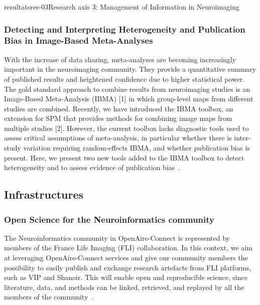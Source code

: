 \documentclass{ra2018}
\begin{document}
\begin{module}{resultats}{res-03}{Research axis 3: Management of Information in Neuroimaging}
\subsubsection{Detecting and Interpreting Heterogeneity and Publication Bias in Image-Based Meta-Analyses}
\begin{participants}
\end{participants}
With the increase of data sharing, meta-analyses are becoming increasingly important in the neuroimaging community. They provide a quantitative summary of published results and heightened confidence due to higher statistical power. The gold standard approach to combine results from neuroimaging studies is an Image-Based Meta-Analysis (IBMA) [1] in which group-level maps from different studies are combined. Recently, we have introduced the IBMA toolbox, an extension for SPM that provides methods for combining image maps from multiple studies [2]. However, the current toolbox lacks diagnostic tools used to assess critical assumptions of meta-analysis, in particular whether there is inter-study variation requiring random-effects IBMA, and whether publication bias is present. Here, we present two new tools added to the IBMA toolbox to detect heterogeneity and to assess evidence of publication bias~\cite{maullinsapey:inserm-01933023}.

\subsection{Infrastructures}
\subsubsection{Open Science for the Neuroinformatics community}
\begin{participants}
\end{participants}
The Neuroinformatics community in OpenAire-Connect is represented by members of the France Life Imaging (FLI) collaboration. In this context, we aim at leveraging OpenAire-Connect services and give our community members the possibility to easily publish and exchange research artefacts from FLI platforms, such as VIP and Shanoir. This will enable open and reproducible science, since literature, data, and methods can be linked, retrieved, and replayed by all the members of the community~\cite{pop:inserm-01846994}.


\end{module}
\end{document}
